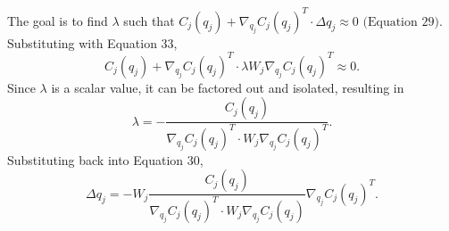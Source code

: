 \documentclass[12pt, letterpaper]{article}
\begin{document}
The goal is to find $\lambda$ such that $C_j(q_j) + \nabla_{q_j} C_j(q_j)^{T} \cdot \Delta q_j \approx 0$ $\text{(Equation 29)}$. Substituting with Equation 33, 
\begin{equation}
    C_j(q_j) + \nabla_{q_j}C_j(q_j)^{T} \cdot \lambda W_j \nabla_{q_j}C_j(q_j)^{T} \approx 0.
\end{equation}
Since $\lambda$ is a scalar value, it can be factored out and isolated, resulting in
\begin{equation}
    \lambda = -\frac{C_j(q_j)}{\nabla_{q_j} C_j(q_j)^{T} \cdot W_j \nabla_{q_j}C_j(q_j)^{T}}.
\end{equation}
Substituting back into Equation 30,
\begin{equation}
    \Delta q_j = -W_j \frac{C_j(q_j)}{\nabla_{q_j} C_j(q_j)^{T} \cdot W_j \nabla_{q_j} C_j(q_j)}\nabla_{q_j} C_j(q_j)^{T}.
\end{equation}
\end{document}
